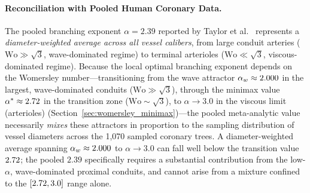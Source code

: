\paragraph{Reconciliation with Pooled Human Coronary Data.}

The pooled branching exponent $\alpha = 2.39$ reported by Taylor et
al.~\cite{taylor2024} represents a \emph{diameter-weighted average across all
vessel calibers}, from large conduit arteries ($\mathrm{Wo} \gg \sqrt{3}$,
wave-dominated regime) to terminal arterioles ($\mathrm{Wo} \ll \sqrt{3}$,
viscous-dominated regime). Because the local optimal branching exponent depends
on the Womersley number---transitioning from the wave attractor $\alpha_w
\approx 2.000$ in the largest, wave-dominated conduits ($\mathrm{Wo} \gg
\sqrt{3}$), through the minimax value $\alpha^* \approx 2.72$ in the
transition zone ($\mathrm{Wo} \sim \sqrt{3}$), to $\alpha \to 3.0$ in the
viscous limit (arterioles) (Section~\ref{sec:womersley_minimax})---the pooled
meta-analytic value necessarily \emph{mixes} these attractors in proportion to
the sampling distribution of vessel diameters across the 1,070 sampled coronary
trees. A diameter-weighted average spanning $\alpha_w \approx 2.000$
to $\alpha \to 3.0$ can fall well below the transition value $2.72$;
the pooled $2.39$ specifically requires a substantial contribution from the
low-$\alpha$, wave-dominated proximal conduits, and cannot arise from a mixture
confined to the $[2.72, 3.0]$ range alone.

